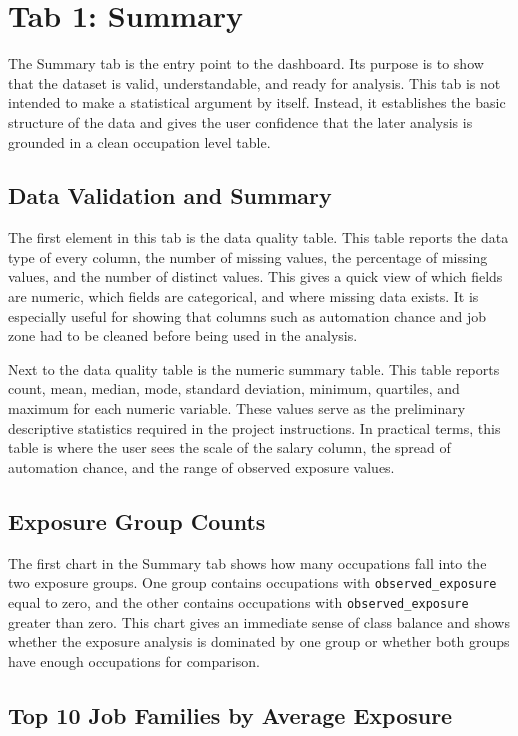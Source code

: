 \documentclass[11pt]{article}
\begin{document}
\section*{Tab 1: Summary}

The Summary tab is the entry point to the dashboard. Its purpose is to show that the dataset is valid, understandable, and ready for analysis. This tab is not intended to make a statistical argument by itself. Instead, it establishes the basic structure of the data and gives the user confidence that the later analysis is grounded in a clean occupation level table.

\subsection*{Data Validation and Summary}

The first element in this tab is the data quality table. This table reports the data type of every column, the number of missing values, the percentage of missing values, and the number of distinct values. This gives a quick view of which fields are numeric, which fields are categorical, and where missing data exists. It is especially useful for showing that columns such as automation chance and job zone had to be cleaned before being used in the analysis.

Next to the data quality table is the numeric summary table. This table reports count, mean, median, mode, standard deviation, minimum, quartiles, and maximum for each numeric variable. These values serve as the preliminary descriptive statistics required in the project instructions. In practical terms, this table is where the user sees the scale of the salary column, the spread of automation chance, and the range of observed exposure values.

\subsection*{Exposure Group Counts}

The first chart in the Summary tab shows how many occupations fall into the two exposure groups. One group contains occupations with \texttt{observed\_exposure} equal to zero, and the other contains occupations with \texttt{observed\_exposure} greater than zero. This chart gives an immediate sense of class balance and shows whether the exposure analysis is dominated by one group or whether both groups have enough occupations for comparison.

\subsection*{Top 10 Job Families by Average Exposure}
\end{document}
